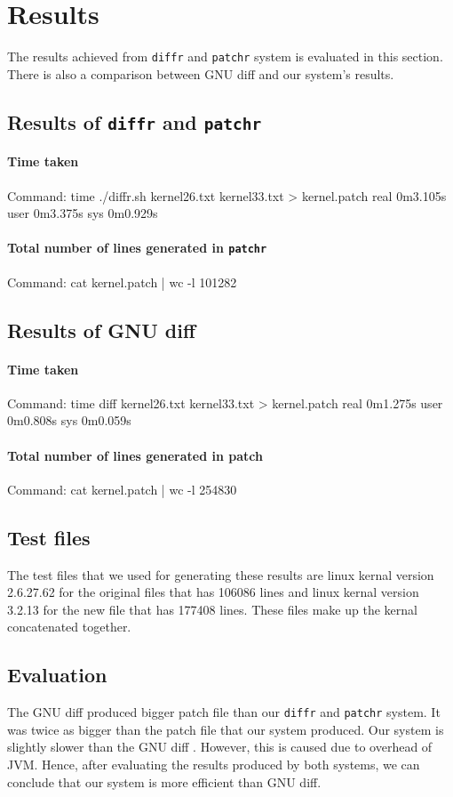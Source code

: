 \section{Results}

The results achieved from \texttt{diffr} and \texttt{patchr} system is evaluated in this section. There is also a comparison between GNU diff and our system's results. 

\subsection{Results of \texttt{diffr} and \texttt{patchr} }
\paragraph{Time taken}
Command: time ./diffr.sh kernel26.txt kernel33.txt > kernel.patch
real	0m3.105s
user	0m3.375s
sys	0m0.929s
\paragraph{Total number of lines generated in \texttt{patchr}}
Command: cat kernel.patch | wc -l
101282
  
\subsection{Results of GNU diff }
\paragraph{Time taken}
Command: time diff kernel26.txt kernel33.txt > kernel.patch
real	0m1.275s
user	0m0.808s
sys	0m0.059s
\paragraph{Total number of lines generated in patch}
Command: cat kernel.patch | wc -l
254830
  
\subsection{Test files}
The test files that we used for generating these results are linux kernal version 2.6.27.62 for the original files that has 106086 lines and linux kernal version 3.2.13 for the new file that has 177408 lines. These files make up the kernal concatenated together. 

\subsection{Evaluation}
The GNU diff produced bigger patch file than our \texttt{diffr} and \texttt{patchr} system. It was twice as bigger than the patch file that our system produced. Our system is slightly slower than the GNU diff . However, this is caused due to overhead of JVM. Hence, after evaluating the results produced by both systems, we can conclude that our system is more efficient than GNU diff.


